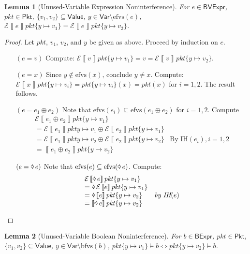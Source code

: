 \documentclass{article}
\newcommand{\pkt}{\mathit{pkt}}
\newcommand{\denote}[1]{\left\llbracket#1\right\rrbracket}
\newcommand{\edenote}[1]{\mathcal{E}\denote{#1}}
\newcommand{\binop}{\mathbin{\oplus}}
\newcommand{\unop}{\mathop{\text{\pointer}}}
\newcommand{\Value}{\mathsf{Value}}
\newcommand{\BVExpr}{\mathsf{BVExpr}}
\newcommand{\BExpr}{\mathsf{BExpr}}
\newcommand{\Pkt}{\mathsf{Pkt}}
\newcommand{\Var}{\mathsf{Var}}
\newcommand{\efvs}{\textrm{efvs}}
\newcommand{\bfvs}{\textrm{bfvs}}
\theoremstyle{plain}
\newtheorem{lemma}{Lemma}
\theoremstyle{definition}
\theoremstyle{remark}
\begin{document}
\begin{lemma}[Unused-Variable Expression Noninterference]
  \label{lem:exp-param-noninter}
  For $e \in \BVExpr$, $\pkt \in \Pkt$,
  $\{v_1,v_2\} \subseteq \Value$, $y \in \Var \setminus \efvs(e) $,
  $\edenote{e}\pkt\{y \mapsto v_1\} = \edenote{e}pkt\{y \mapsto v_2\}$.
\end{lemma}
\begin{proof}
  Let $\pkt$, $v_1$, $v_2$, and $y$ be given as above. Proceed by induction on
  $e$.
  \begin{enumerate}[align=left]
    \item[$(e = v)$] Compute: $\edenote{v}\pkt\{y
      \mapsto v_1\} = v = \edenote{v}pkt\{y \mapsto v_2\}$.
    \item[$(e = x)$] Since $y \not\in \efvs(x)$, conclude $y \neq x$. Compute:
      $\edenote{x}\pkt\{y \mapsto v_i\} = \pkt\{y \mapsto v_i\}(x) = \pkt(x) $
      for $i = 1,2$. The result follows.

    \item[$(e = e_1 \binop e_2)$]
      Note that $\efvs(e_i) \subseteq \efvs(e_1 \binop e_2)$ for $i = 1,2$. Compute
      \[\begin{array}{ll}
      \edenote{e_1 \binop e_2}\pkt\{y \mapsto v_1\} \\
      = \edenote{e_1}\pkt{y \mapsto v_1} \binop \edenote{e_2}\pkt\{y \mapsto v_1\} \\
      = \edenote{e_1}\pkt{y \mapsto v_2} \binop \edenote{e_2}\pkt\{y \mapsto v_2\} & \text{By IH}(e_i), i = 1,2\\
      = \denote{e_1 \binop e_2}\pkt\{y \mapsto v_2\}
      \end{array}
      \]

    \item[$(e = \unop e)$]
      Note that $\efvs(e) \subseteq \efvs(\unop e)$. Compute:
      \[\begin{array}{ll}
      \edenote{\unop e}\pkt\{y \mapsto v_1\} \\
      = \unop \edenote{e}\pkt\{y \mapsto v_1\} \\
      = \unop \denote{e}\pkt\{y \mapsto v_2\} & \textit{by IH}(e)\\
      = \denote{\unop e}\pkt\{y \mapsto v_2\}
      \end{array}\]
  \end{enumerate}
\end{proof}


\begin{lemma}[Unused-Variable Boolean Noninterference]
  \label{lem:bool-noninter}
  For $b \in \BExpr$, $\pkt \in \Pkt$,
  $\{v_1,v_2\} \subseteq \Value$, $y \in \Var \setminus \bfvs(b) $,
  $\pkt\{y \mapsto v_1\} \models b \iff pkt\{y \mapsto v_2\} \models b$.
\end{lemma}
\end{document}
